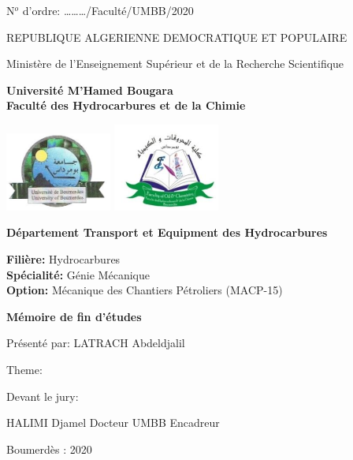 {\small N$^o$ d'ordre: \ldots\ldots\ldots/Faculté/UMBB/2020}
\begin{center}
	{\large REPUBLIQUE ALGERIENNE DEMOCRATIQUE ET POPULAIRE}

	{\large Ministère de l'Enseignement Supérieur et de la Recherche Scientifique}

	\vspace{.6cm}
\textbf{Université M'Hamed Bougara}\\ 
\textbf{Faculté des Hydrocarbures et de la Chimie} 

\includegraphics[width=3.5cm]{misc/logos/umbb}\hfill
\includegraphics[width=3.5cm]{misc/logos/fhc}

\textbf{Département Transport et Equipment des Hydrocarbures} 
\end{center}

\vspace{1cm}

\textbf{Filière:} Hydrocarbures\\
\textbf{Spécialité:} Génie Mécanique\\
\textbf{Option:} Mécanique des Chantiers Pétroliers (MACP-15) 

\vspace{1cm}

\begin{center}
	\textbf{Mémoire de fin d'études} 

	Présenté par: LATRACH Abdeldjalil

	\vspace{.5cm}

	Theme:

	\vspace{.5cm}

\end{center}

Devant le jury:

HALIMI Djamel\hspace{2cm} Docteur\hspace{2cm} UMBB\hspace{2cm} Encadreur

\vfill

\begin{center}
	Boumerdès : 2020
\end{center}
